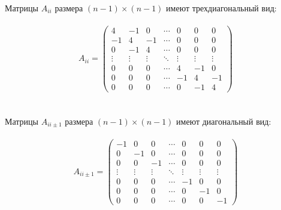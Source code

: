 \documentclass[12pt, a4paper]{article}
\begin{document}
	Матрицы $A_{ii}$ размера $(n-1) \times (n-1)$ имеют трехдиагональный вид: \\\\
	\begin{equation*}
	A_{ii} =
		\begin{pmatrix}
			4       & -1      & 0       & \cdots & 0      & 0      & 0      \\
			-1      & 4       & -1      & \cdots & 0      & 0      & 0      \\
			0       & -1      & 4       & \cdots & 0      & 0      & 0      \\
			\vdots  & \vdots  & \vdots  & \ddots & \vdots & \vdots & \vdots \\
			0       & 0       &  0      & \cdots & 4      & -1     & 0      \\
			0       & 0       &  0      & \cdots & -1     & 4      & -1     \\
			0       & 0       &  0      & \cdots & 0      & -1     & 4
		\end{pmatrix}
	\end{equation*} \\\\
	Матрицы $A_{ii \pm 1}$ размера $(n-1) \times (n-1)$ имеют диагональный вид: \\\\
	\begin{equation*}
	A_{ii \pm 1} =
		\begin{pmatrix}
			-1      & 0       & 0       & \cdots & 0      & 0      & 0      \\
			0       & -1      & 0       & \cdots & 0      & 0      & 0      \\
			0       & 0       & -1      & \cdots & 0      & 0      & 0      \\
			\vdots  & \vdots  & \vdots  & \ddots & \vdots & \vdots & \vdots \\
			0       & 0       &  0      & \cdots & -1     & 0      & 0      \\
			0       & 0       &  0      & \cdots & 0      & -1     & 0      \\
			0       & 0       &  0      & \cdots & 0      & 0      & -1
		\end{pmatrix}
	\end{equation*} \\\\\\\\\\\\
\end{document}

